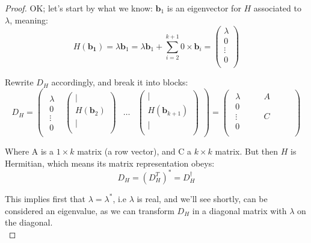 \documentclass[solutions.tex]{subfiles}
\renewcommand{\bm}[1]{\pmb{#1}}
\begin{document}
\begin{proof}
OK; let's start by what we know: $\bm{b}_1$ is an eigenvector for $H$ associated
to $\lambda$, meaning:
\[
	H(\bm{b_1}) = \lambda\bm{b}_1
		= \lambda\bm{b}_1 + \sum_{i=2}^{k+1} 0 \times \bm{b}_i
		= \begin{pmatrix}
			\lambda \\
			0       \\
			\vdots \\
			0      \\
		\end{pmatrix}
\]

Rewrite $D_H$ accordingly, and break it into blocks:
\[
	D_H = \begin{pmatrix}
		\begin{matrix}
			\lambda \\
			0 \\
			\vdots \\
			0
		\end{matrix} &
		\begin{pmatrix}
			\bigg\vert \\
			H(\bm{b}_2) \\
			\bigg\vert \\
		\end{pmatrix} &
		\ldots &
		\begin{pmatrix}
			\bigg\vert \\
			H(\bm{b}_{k+1}) \\
			\bigg\vert \\
		\end{pmatrix}
	\end{pmatrix} = \begin{pmatrix}\begin{array}{c|c}
		\lambda & \qquad A \qquad\\
		\hline
		0       & \qquad ~ \qquad \\
		\vdots  & \qquad C \qquad \\
		0       & \qquad ~ \qquad \\
	\end{array}\end{pmatrix}
\]

Where A is a $1\times k$ matrix (a row vector), and C
 a $k\times k$ matrix. But then $H$ is Hermitian, which
means its matrix representation obeys:
\[
	D_H = (D_H^T)^* = D_H^\dagger
\]

This implies first that $\lambda = \lambda^*$, i.e $\lambda$ is
real, and we'll see shortly, can be considered an eigenvalue,
as we can transform $D_H$ in a diagonal matrix with $\lambda$
on the diagonal. \\


\end{proof}
\end{document}
